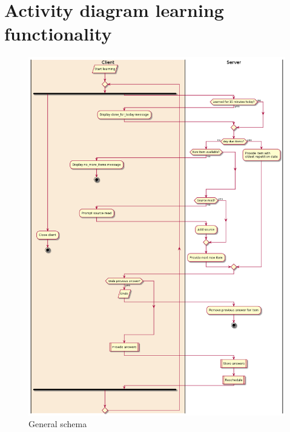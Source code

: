 \section{Activity diagram learning functionality}
\label{app:learningactivity}
\begin{figure}[h!]
\centering
\includegraphics[width=.9\textwidth]{img/learningactivitygen.png}
\caption{General schema}
\end{figure}
